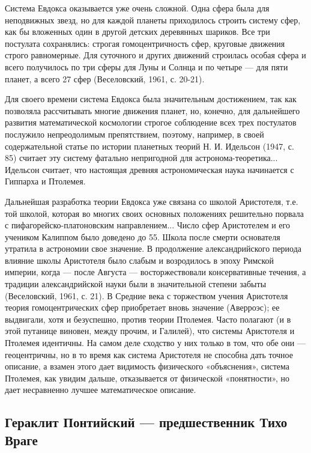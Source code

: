Система Евдокса оказывается уже очень сложной. Одна сфера была для
неподвижных звезд, но для каждой планеты приходилось строить систему
сфер, как бы вложенных один в другой детских деревянных шариков. Все
три постулата сохранялись: строгая гомоцентричность сфер, круговые
движения строго равномерные. Для суточного и других движений строилась
особая сфера и всего получилось по три сферы для Луны и Солнца и по
четыре --- для пяти планет, а всего 27 сфер (Веселовский, 1961, с.
20-21).

Для своего времени система Евдокса была значительным достижением, так
как позволяла рассчитывать многие движения планет, но, конечно, для
дальнейшего развития математической космологии строгое соблюдение всех
трех постулатов послужило непреодолимым препятствием, поэтому,
например, в своей содержательной статье по истории планетных теорий Н.
И. Идельсон (1947, с. 85) считает эту систему фатально непригодной для
астронома-теоретика... Идельсон считает, что настоящая древняя
астрономическая наука начинается с Гиппарха и Птолемея.

Дальнейшая разработка теории Евдокса уже связана со школой Аристотеля,
т.е. той школой, которая во многих своих основных положениях
решительно порвала с пифагорейско-платоновским направлением... Число
сфер Аристотелем и его учеником Калиппом было доведено до 55. Школа
после смерти основателя утратила в астрономии свое значение. В
продолжение александрийского периода влияние школы Аристотеля было
слабым и возродилось в эпоху Римской империи, когда --- после Августа
--- восторжествовали консервативные течения, а традиции
александрийской науки были в значительной степени забыты (Веселовский,
1961, с. 21). В Средние века с торжеством учения Аристотеля теория
гомоцентрических сфер приобретает вновь значение (Аверроэс); ее
выдвигали, хотя и безуспешно, против теории Птолемея. Часто полагают
(и в этой путанице виновен, между прочим, и Галилей), что системы
Аристотеля и Птолемея идентичны. На самом деле сходство у них только в
том, что обе они --- геоцентричны, но в то время как система
Аристотеля не способна дать точное описание, а взамен этого дает
видимость физического «объяснения», система Птолемея, как увидим
дальше, отказывается от физической «понятности», но дает несравненно
лучшее математическое описание.

\subsection{Гераклит Понтийский --- предшественник Тихо Враге}

